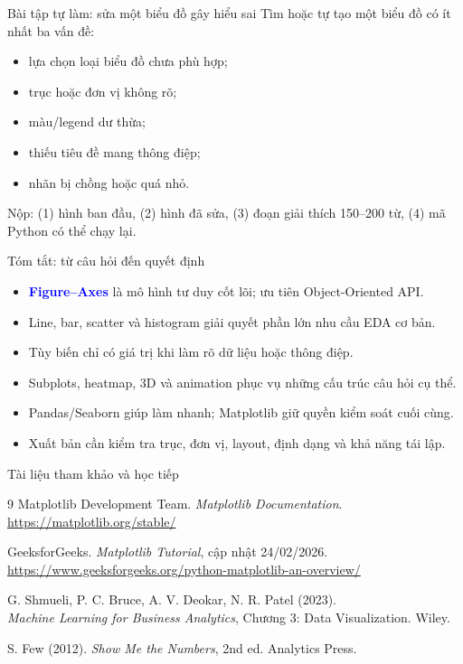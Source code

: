 \documentclass[aspectratio=169,12pt]{beamer}
\newcommand{\key}[1]{\textcolor{Blue}{\textbf{#1}}}
\newenvironment{tightitems}{\begin{itemize}\setlength\itemsep{5pt}}{\end{itemize}}
\begin{document}
\begin{frame}{Bài tập tự làm: sửa một biểu đồ gây hiểu sai}
Tìm hoặc tự tạo một biểu đồ có ít nhất ba vấn đề:
\begin{itemize}
  \item lựa chọn loại biểu đồ chưa phù hợp;
  \item trục hoặc đơn vị không rõ;
  \item màu/legend dư thừa;
  \item thiếu tiêu đề mang thông điệp;
  \item nhãn bị chồng hoặc quá nhỏ.
\end{itemize}
Nộp: (1) hình ban đầu, (2) hình đã sửa, (3) đoạn giải thích 150--200 từ, (4) mã Python có thể chạy lại.
\end{frame}

\begin{frame}{Tóm tắt: từ câu hỏi đến quyết định}
\footnotesize
\begin{tightitems}
  \item \key{Figure--Axes} là mô hình tư duy cốt lõi; ưu tiên Object-Oriented API.
  \item Line, bar, scatter và histogram giải quyết phần lớn nhu cầu EDA cơ bản.
  \item Tùy biến chỉ có giá trị khi làm rõ dữ liệu hoặc thông điệp.
  \item Subplots, heatmap, 3D và animation phục vụ những cấu trúc câu hỏi cụ thể.
  \item Pandas/Seaborn giúp làm nhanh; Matplotlib giữ quyền kiểm soát cuối cùng.
  \item Xuất bản cần kiểm tra trục, đơn vị, layout, định dạng và khả năng tái lập.
\end{tightitems}
\end{frame}

\begin{frame}{Tài liệu tham khảo và học tiếp}
\small
\begin{thebibliography}{9}
 Matplotlib Development Team. \emph{Matplotlib Documentation}.\\
\url{https://matplotlib.org/stable/}

 GeeksforGeeks. \emph{Matplotlib Tutorial}, cập nhật 24/02/2026.\\
\url{https://www.geeksforgeeks.org/python-matplotlib-an-overview/}

 G. Shmueli, P. C. Bruce, A. V. Deokar, N. R. Patel (2023).\\
\emph{Machine Learning for Business Analytics}, Chương 3: Data Visualization. Wiley.

 S. Few (2012). \emph{Show Me the Numbers}, 2nd ed. Analytics Press.
\end{thebibliography}
\end{frame}
\end{document}
